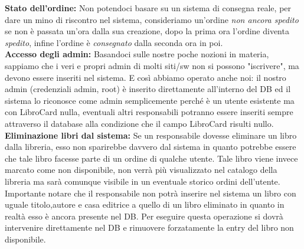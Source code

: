 \documentclass[a4paper,12pt,titlepage]{article}
\begin{document}
\textbf{Stato dell'ordine:} Non potendoci basare su un sistema di consegna reale, per dare un mino di riscontro nel sistema, consideriamo un'ordine \textit{non ancora spedito} se non è passata un'ora dalla sua creazione,
dopo la prima ora l'ordine diventa \textit{spedito}, infine l'ordine è \textit{consegnato}  dalla seconda ora in poi.\\

\textbf{Accesso degli admin:} Basandoci sulle nostre poche nozioni in materia, sappiamo che i veri e 
propri admin di molti siti/sw non si possono "iscrivere", ma devono essere inseriti nel sistema. 
E così abbiamo operato anche noi: il nostro admin (credenziali admin, root) è inserito direttamente 
all'interno del DB ed il sistema lo riconosce come admin semplicemente perché è un utente esistente ma con LibroCard nulla,
eventuali altri responsabili potranno essere inseriti sempre attraverso il database alla condizione che il campo LibroCard risulti nullo.\\

\textbf{Eliminazione libri dal sistema: }Se un responsabile dovesse eliminare un libro dalla libreria, esso non sparirebbe davvero dal sistema in quanto potrebbe essere che tale libro facesse parte di un ordine di qualche utente. Tale libro viene invece marcato come non disponibile, non verrà più visualizzato nel catalogo della libreria ma sarà comunque visibile in un eventuale storico ordini dell'utente. Importante notare che il responsabile non potrà inserire nel sistema un libro con uguale titolo,autore e casa editrice a quello di un libro eliminato in quanto in realtà esso è ancora presente nel DB. Per eseguire questa operazione si dovrà intervenire direttamente nel DB e rimuovere forzatamente la entry del libro non disponibile.

\cleardoublepage
\end{document}

